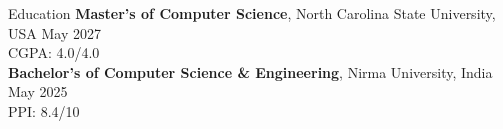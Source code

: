 \documentclass{resume} %
\begin{document}








\vspace{-0.75em}

\begin{rSection}{Education}
{\bf Master's of Computer Science}, North Carolina State University, USA \hfill {May 2027}\\
CGPA: 4.0/4.0
\\
{\bf Bachelor's of Computer Science \& Engineering}, Nirma University, India \hfill {May 2025}\\
PPI: 8.4/10


\end{rSection}
\vspace{-0.75em}
\end{document}
